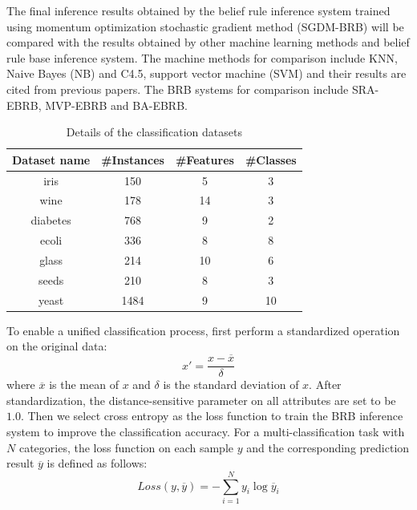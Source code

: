 \documentclass{ieeeaccess}
\begin{document}
The final inference results obtained by the belief rule inference system trained using momentum optimization stochastic gradient method (SGDM-BRB) will be compared with the results obtained by
other machine learning methods and belief rule base inference system.
The machine methods for comparison include KNN, Naive Bayes (NB) and C4.5, support vector machine (SVM)
and their results are cited from previous papers\cite{a22,a27}.
The BRB systems for comparison include SRA-EBRB\cite{a20}, MVP-EBRB\cite{a21} and BA-EBRB\cite{a22}.

\begin{table}
    \caption{Details of the classification datasets}
    \centering
    \normalsize
    \label{tab4}
    \begin{tabular}{cccc}
        \hline
        Dataset name & \#Instances & \#Features & \#Classes \\
        \hline
        iris         & 150         & 5          & 3         \\
        wine         & 178         & 14         & 3         \\
        diabetes     & 768         & 9          & 2         \\
        ecoli        & 336         & 8          & 8         \\
        glass        & 214         & 10         & 6         \\
        seeds        & 210         & 8          & 3         \\
        yeast        & 1484        & 9          & 10        \\
        \hline
    \end{tabular}
\end{table}

To enable a unified classification process, first perform a standardized operation on the original data:
$$x'=\frac{x-\overline{x}}{\delta}$$
where $\overline{x}$ is the mean of $x$ and $\delta$ is the standard deviation of $x$.
After standardization, the distance-sensitive parameter on all attributes are set to be $1.0$.
Then we select cross entropy as the loss function to train the BRB inference system to improve the classification accuracy.
For a multi-classification task with $N$ categories, the loss function on each sample $y$ and the corresponding prediction result $\overline{y}$ is defined as follows:
$$Loss(y,\overline{y})=-\sum_{i=1}^Ny_{i}\log\overline{y}_i$$
\end{document}
